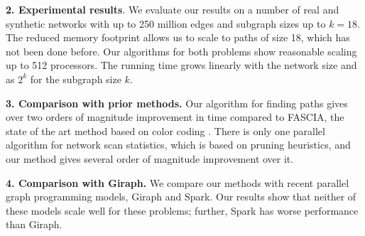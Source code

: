 \noindent
\textbf{2. Experimental results}. We evaluate our results on a number of real and synthetic networks 
with up to 250 million edges and subgraph sizes up to $k=18$. The reduced memory footprint
allows us to scale to paths of size 18, which has not been done before.  Our algorithms for
both problems show reasonable scaling up to 512 processors. The running time grows linearly
with the network size and as $2^k$ for the subgraph size $k$.

\noindent
\textbf{3. Comparison with prior methods.}
Our algorithm for finding paths gives over two orders of magnitude improvement in time
compared to FASCIA, the state of the art method based on color coding \cite{slota:icpp13, slota:ipdps14}.
There is only one parallel algorithm for network scan statistics, which is based on pruning heuristics,
and our method gives several order of magnitude improvement over it.

\noindent
\textbf{4. Comparison with Giraph.}
We compare our methods with recent parallel graph programming models, Giraph and Spark.
Our results show that neither of these models scale well for these problems; further,
Spark has worse performance than Giraph.


%
%


